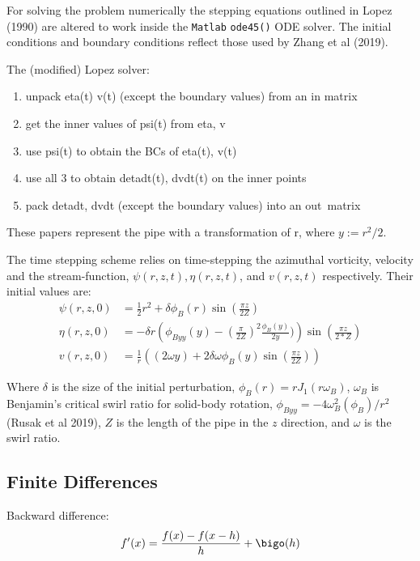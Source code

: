 \documentclass{X:/Documents/Coding/Latex/myreport}
\begin{document}
For solving the problem numerically the stepping equations outlined in Lopez (1990) are altered to work inside the \verb|Matlab| \verb|ode45()| ODE solver. The initial conditions and boundary conditions reflect those used by Zhang et al (2019).


The (modified) Lopez solver:
\begin{enumerate}
    \item unpack eta(t) v(t) (except the boundary values) from an in matrix
    \item get the inner values of psi(t) from eta, v
    \item  use psi(t) to obtain the BCs of eta(t), v(t)
    \item use all 3 to obtain detadt(t), dvdt(t) on the inner points
    \item pack detadt, dvdt (except the boundary values) into an out matrix
\end{enumerate}





These papers represent the pipe with a transformation of r, where $y := r^2/2$. 

The time stepping scheme relies on time-stepping the azimuthal vorticity, velocity and the stream-function, $\psi(r,z,t), \eta(r,z,t)$, and $v(r,z,t)$ respectively. Their initial values are:
\begin{align*}
    \psi(r,z,0) &= \frac12 r^2 + \delta \phi_B(r) \sin \left(\frac{\pi z}{2Z}\right)\\
    \eta(r,z,0) &= - \delta  r\left(\phi_{Byy}(y) - (\frac{\pi}{2Z})^2\frac{\phi_B(y)}{2y})\right)\sin(\frac{\pi z}{2*Z})\\
    v(r,z,0) &= \frac{1}{r} \left((2\omega y) + 2\delta\omega\phi_B(y)\sin\left(\frac{\pi z}{2Z}\right)\right)
\end{align*}

Where $\delta$ is the size of the initial perturbation, $\phi_B(r) = r J_1(r \omega_B)$, $\omega_B$ is Benjamin's critical swirl ratio for solid-body rotation, $\phi_{Byy} = -4 \omega_B^2 (\phi_B)/r^2$ (Rusak et al 2019), $Z$ is the length of the pipe in the $z$ direction, and $\omega$ is the swirl ratio.




\subsection{Finite Differences}
Backward difference:
\[f'(x) = \frac{f(x) - f(x-h)}{h} + \bigo(h)\]
\end{document}
